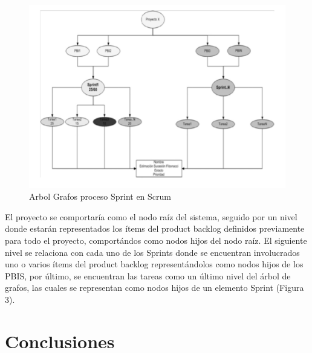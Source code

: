\documentclass[preprint,12pt]{elsarticle}
\begin{document}
\begin{figure}[htb]
	\begin{center}
		\includegraphics[width=14cm]{./IMAGENES/basededatos_4} 
		\caption{Arbol Grafos proceso Sprint en Scrum}
	\end{center}
\end{figure}

El proyecto se comportaría como el nodo raíz del sistema, seguido por un nivel donde estarán representados los ítems del product backlog definidos
previamente para todo el proyecto, comportándos  como nodos hijos del nodo raíz. El siguiente nivel se relaciona con cada uno de los Sprints donde
se encuentran involucrados uno o varios ítems del product backlog representándolos como nodos hijos de los PBIS, por último, se encuentran las tareas
como un último nivel del árbol de grafos, las cuales se representan como nodos hijos de un elemento Sprint (Figura 3).






\section{Conclusiones}
\end{document}
